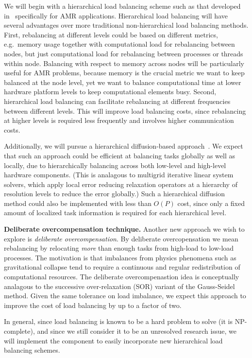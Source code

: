 \documentclass[10pt,twocolumn]{article}
\begin{document}
We will begin with a hierarchical load balancing scheme such as that
developed in~\cite{LaTa06} specifically for AMR applications.
Hierarchical load balancing will have several advantages over more
traditional non-hierarchical load balancing methods.  First,
rebalancing at different levels could be based on different metrics,
e.g.~memory usage together with computational load for rebalancing
between nodes, but just computational load for rebalancing between
processes or threads within node.  Balancing with respect to memory
across nodes will be particularly useful for AMR problems, because
memory is the crucial metric we want to keep balanced at the node
level, yet we want to balance computational time at lower hardware
platform levels to keep computational elements busy.  Second,
hierarchical load balancing can facilitate rebalancing at different
frequencies between different levels.  This will improve load
balancing costs, since rebalancing at higher levels is required less
frequently and involves higher communication costs.

\nocite{ScKa97}
Additionally, we will pursue a hierarchical diffusion-based
approach~\cite{MeMo09}.  We expect that such an approach could be
efficient at balancing tasks globally as well as locally, due to
hierarchically balancing across both low-level and high-level hardware
components.  (This is analagous to multigrid iterative linear system
solvers, which apply local error reducing relaxation operators at a
hierarchy of resolution levels to reduce the error globally.)  Such a
hierarchical diffusion method could also be implemented with less than
$O(P)$ cost, since only a fixed amount of localized task information
is required for each hierarchical level.

\textbf{Deliberate overcompensation technique.}
%
Another new approach we wish to explore is \textit{deliberate
  overcompensation}.  By deliberate overcopensation we mean
rebalancing by relocating \textit{more} than enough tasks from
high-load to low-load processes.  The motivation is that imbalances
from physics phenomena such as gravitational collapse tend to require
a continuous and regular redistribution of computational resources.
The deliberate overcompenastion idea is conceptually analagous to the
successive over-relaxation (SOR) variant of the Gauss-Seidel method.
Given the same tolerance on load imbalance, we expect this approach to
improve the cost of load balancing by up to a factor of two.

In general, since load balancing is known to be a hard problem to
solve (it is NP-complete), and since we still consider it to be an
unresolved research issue, we will implement the 
component to easily incorporate new hierarchical load balancing
schemes.
\end{document}

